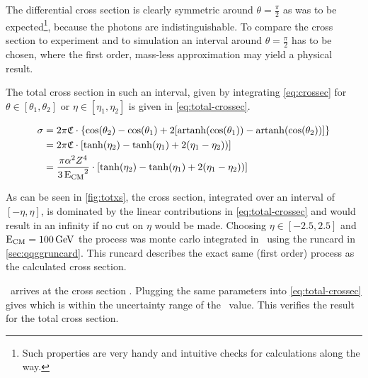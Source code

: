 The differential cross section is clearly symmetric around
\(\theta=\frac{\pi}{2}\) as was to be expected\footnote{Such
  properties are very handy and intuitive checks for calculations
  along the way.}, because the photons are indistinguishable. To
compare the cross section to experiment and to simulation an interval
around \(\theta=\frac{\pi}{2}\) has to be chosen, where the first
order, mass-less approximation may yield a physical result.

The total cross section in such an interval, given by
integrating \cref{eq:crossec} for \(\theta\in [\theta_1, \theta_2]\)
or \(\eta\in [\eta_1, \eta_2]\) is given
in \cref{eq:total-crossec}.

\begin{equation}
  \label{eq:total-crossec}
  \begin{split}
  \sigma &=
  2\pi\mathfrak{C}\cdot\qty{\cos(\theta_2)-\cos(\theta_1)+2\qty[\operatorname{artanh}(\cos(\theta_1))
    - \operatorname{artanh}(\cos(\theta_2))]} \\
  &=2\pi\mathfrak{C}\cdot\qty[\tanh(\eta_2) - \tanh(\eta_1) + 2(\eta_1
  - \eta_2))] \\
  &={\frac{\pi\alpha^2Z^4}{3\operatorname{E_{\text{CM}}}^2}}\cdot\qty[\tanh(\eta_2) - \tanh(\eta_1) + 2(\eta_1
  - \eta_2))]
  \end{split}
\end{equation}

As can be seen in \cref{fig:totxs}, the cross section, integrated over
an interval of \([-\eta, \eta]\), is dominated by the linear
contributions in \cref{eq:total-crossec} and would result in an
infinity if no cut on \(\eta\) would be made.  Choosing
\(\eta\in [-2.5,2.5]\) and \(\operatorname{E_{\text{CM}}}=\SI{100}{\giga\electronvolt}\) the
process was monte carlo integrated in \sherpa\ using the runcard
in \cref{sec:qqggruncard}. This runcard describes the exact same (first
order) process as the calculated cross section.

\sherpa\ arrives at the cross section . Plugging
the same parameters into \cref{eq:total-crossec} gives
 which is within the uncertainty range of the
\sherpa\ value. This verifies the result for the total cross section.

